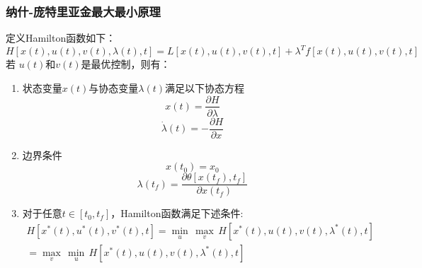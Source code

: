 \subsubsection{纳什-庞特里亚金最大最小原理}
定义Hamilton函数如下：
$$H[x(t),u(t),v(t),\lambda (t),t]=L[x(t),u(t),v(t),t]+{{\lambda }^{T}}f[x(t),u(t),v(t),t]$$
若 $u(t)$和$v(t)$是最优控制，则有：
\begin{enumerate}[(1)]
    \item 状态变量$x(t)$与协态变量$\lambda (t)$满足以下协态方程
          \begin{equation}
              x(t)=\frac{\partial H}{\partial \lambda }
          \end{equation}
          \begin{equation}
              \dot{\lambda }(t)=-\frac{\partial H}{\partial x}
          \end{equation}
    \item 边界条件
          \begin{equation}
              x({{t}_{0}})={{x}_{0}}
          \end{equation}
          \begin{equation}
              \lambda ({{t}_{f}})=\frac{\partial \theta [x({{t}_{f}}),{{t}_{f}}]}{\partial x({{t}_{f}})}
          \end{equation}
    \item 对于任意$t\in[t_0,t_f]$，Hamilton函数满足下述条件:
          \begin{align}
              \nonumber H[{{x}^{*}}(t),{{u}^{*}}(t),{{v}^{*}}(t),t]=\underset{u}{\mathop{\text{ }\min}}\,\underset{v}{\mathop{\max}}\,H[{{x}^{*}}(t),u(t),v(t),{{\lambda }^{*}}(t),t] \\
              =\underset{v}{\mathop{\text{ }\max}}\, \underset{u}{\mathop{\min}}\,H[{{x}^{*}}(t),u(t),v(t),{{\lambda }^{*}}(t),t]
          \end{align}
\end{enumerate}

